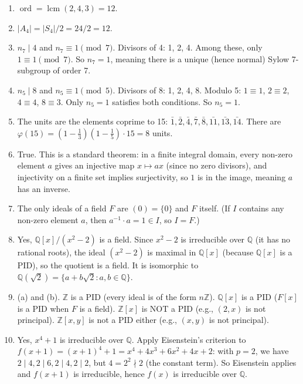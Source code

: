 \documentclass[11pt]{article}
\begin{document}
\begin{enumerate}
\item $\operatorname{ord}=\operatorname{lcm}(2,4,3)=12$.

\item $|A_4|=|S_4|/2=24/2=12$.

\item $n_7\mid 4$ and $n_7\equiv 1\pmod{7}$. Divisors of 4: 1, 2, 4. Among these, only $1\equiv 1\pmod{7}$. So $n_7=1$, meaning there is a unique (hence normal) Sylow 7-subgroup of order 7.

\item $n_5\mid 8$ and $n_5\equiv 1\pmod{5}$. Divisors of 8: 1, 2, 4, 8. Modulo 5: $1\equiv 1$, $2\equiv 2$, $4\equiv 4$, $8\equiv 3$. Only $n_5=1$ satisfies both conditions. So $n_5=1$.

\item The units are the elements coprime to 15: $\bar{1},\bar{2},\bar{4},\bar{7},\bar{8},\bar{11},\bar{13},\bar{14}$. There are $\varphi(15)=(1-\frac{1}{3})(1-\frac{1}{5})\cdot 15=8$ units.

\item True. This is a standard theorem: in a finite integral domain, every non-zero element $a$ gives an injective map $x\mapsto ax$ (since no zero divisors), and injectivity on a finite set implies surjectivity, so $1$ is in the image, meaning $a$ has an inverse.

\item The only ideals of a field $F$ are $(0)=\{0\}$ and $F$ itself. (If $I$ contains any non-zero element $a$, then $a^{-1}\cdot a = 1\in I$, so $I=F$.)

\item Yes, $\mathbb{Q}[x]/(x^2-2)$ is a field. Since $x^2-2$ is irreducible over $\mathbb{Q}$ (it has no rational roots), the ideal $(x^2-2)$ is maximal in $\mathbb{Q}[x]$ (because $\mathbb{Q}[x]$ is a PID), so the quotient is a field. It is isomorphic to $\mathbb{Q}(\sqrt{2})=\{a+b\sqrt{2}:a,b\in\mathbb{Q}\}$.

\item (a) and (b). $\mathbb{Z}$ is a PID (every ideal is of the form $n\mathbb{Z}$). $\mathbb{Q}[x]$ is a PID ($F[x]$ is a PID when $F$ is a field). $\mathbb{Z}[x]$ is NOT a PID (e.g., $(2,x)$ is not principal). $\mathbb{Z}[x,y]$ is not a PID either (e.g., $(x,y)$ is not principal).

\item Yes, $x^4+1$ is irreducible over $\mathbb{Q}$. Apply Eisenstein's criterion to $f(x+1)=(x+1)^4+1=x^4+4x^3+6x^2+4x+2$: with $p=2$, we have $2\mid 4, 2\mid 6, 2\mid 4, 2\mid 2$, but $4=2^2\nmid 2$ (the constant term). So Eisenstein applies and $f(x+1)$ is irreducible, hence $f(x)$ is irreducible over $\mathbb{Q}$.


\end{enumerate}
\end{document}
